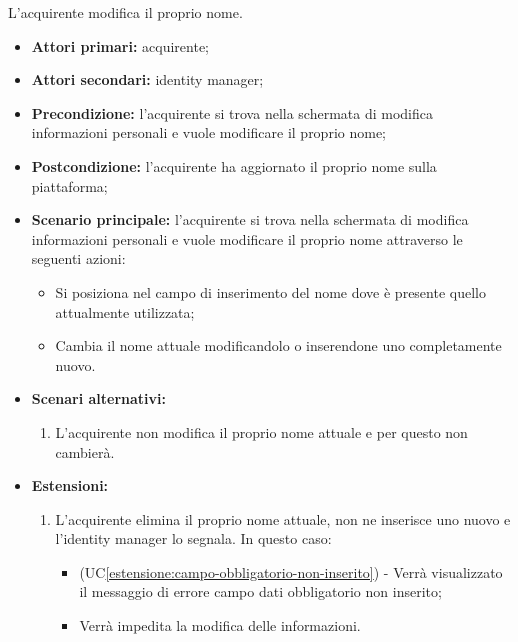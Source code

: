 L'acquirente modifica il proprio nome.
\begin{itemize}
    \item \textbf{Attori primari:} acquirente;
    \item \textbf{Attori secondari:} identity manager;
    \item \textbf{Precondizione:} l'acquirente si trova nella schermata di modifica informazioni personali e vuole modificare il proprio nome;
    \item \textbf{Postcondizione:} l'acquirente ha aggiornato il proprio nome sulla piattaforma;
    \item \textbf{Scenario principale:} l'acquirente si trova nella schermata di modifica informazioni personali e vuole modificare il proprio nome attraverso le seguenti azioni:
        \begin{itemize}
            \item Si posiziona nel campo di inserimento del nome dove è presente quello attualmente utilizzata;
            \item Cambia il nome attuale modificandolo o inserendone uno completamente nuovo.
        \end{itemize}
    \item \textbf{Scenari alternativi:} 
    \begin{enumerate}[label=\lett]
        \item L'acquirente non modifica il proprio nome attuale e per questo non cambierà.
    \end{enumerate}
    \item \textbf{Estensioni:} 
    \begin{enumerate}[label=\lett]
        \item L'acquirente elimina il proprio nome attuale, non ne inserisce uno nuovo e l'identity manager lo segnala. In questo caso:
        \begin{itemize}
            \item (UC\ref{estensione:campo-obbligatorio-non-inserito}) - Verrà visualizzato il messaggio di errore campo dati obbligatorio non inserito;
            \item Verrà impedita la modifica delle informazioni.
        \end{itemize}
    \end{enumerate}
\end{itemize}

\label{modifica-informazioni-acquirente.cognome}


